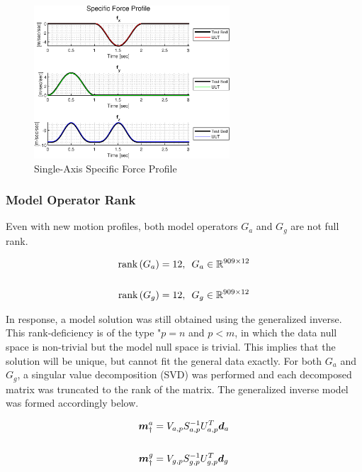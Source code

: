 \begin{figure}[h] 
	\centering
	\includegraphics[width=0.65\textwidth]{./images/SAM_specific_force_profile.eps}
	\caption{Single-Axis Specific Force Profile}
	\label{fig: single-axis specific force profile}
\end{figure}
\FloatBarrier

\subsubsection{Model Operator Rank}

Even with new motion profiles, both model operators $G_a$ and $G_g$ are not full rank. 

\begin{align}
	\textrm{rank}\left(G_a\right) &= 12,\,\,\, G_a \in \mathbb{R}^{909 \times 12} \notag\\
	\\
	\textrm{rank}\left(G_g\right) &= 12,\,\,\, G_g \in \mathbb{R}^{909 \times 12} \notag
\end{align}

In response, a model solution was still obtained using the generalized inverse. This rank-deficiency is of the type "$p = n$ and $p < m$, in which the data null space is non-trivial but the model null space is trivial. This implies that the solution will be unique, but cannot fit the general data exactly. For both $G_a$ and $G_g$, a singular value decomposition (SVD) was performed and each decomposed matrix was truncated to the rank of the matrix. The generalized inverse model was formed accordingly below.

\begin{align}
	\boldsymbol{m}_{\dagger}^{a} &= V_{a,p} S_{a,p}^{-1} U_{a,p}^T \boldsymbol{d}_a \notag\\
	\\
	\boldsymbol{m}_{\dagger}^{g} &= V_{g,p} S_{g,p}^{-1} U_{g,p}^T \boldsymbol{d}_g \notag
\end{align}

